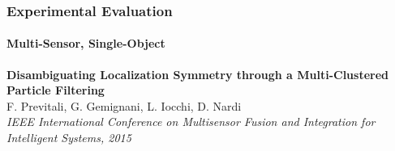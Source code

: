 \begin{frame}
	\frametitle{Experimental Evaluation}
	\framesubtitle{Multi-Sensor, Single-Object}
	
	\vspace{-0.1cm}
	
	\begin{center}
	\end{center}
	
	\vspace{0.545cm}
	
	\tiny
	
	\textbf{Disambiguating Localization Symmetry through a Multi-Clustered Particle Filtering} \\
	F. Previtali, G. Gemignani, L. Iocchi, D. Nardi \\
	\emph{IEEE International Conference on Multisensor Fusion and Integration for Intelligent Systems,
	2015} \\
\end{frame}

